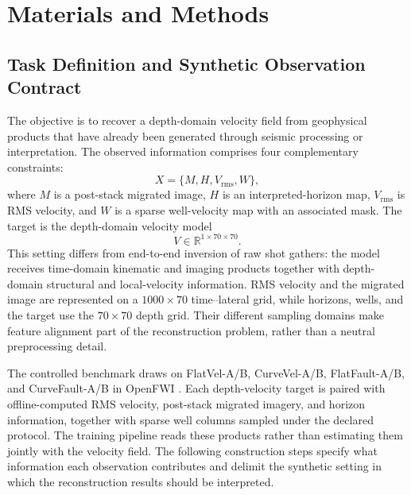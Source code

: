 \section{Materials and Methods}

\subsection{Task Definition and Synthetic Observation Contract}

The objective is to recover a depth-domain velocity field from geophysical products that have already been generated through seismic processing or interpretation. The observed information comprises four complementary constraints:
\[
X=\{M,H,V_{\mathrm{rms}},W\},
\]
where $M$ is a post-stack migrated image, $H$ is an interpreted-horizon map, $V_{\mathrm{rms}}$ is RMS velocity, and $W$ is a sparse well-velocity map with an associated mask. The target is the depth-domain velocity model
\[
V\in\mathbb{R}^{1\times70\times70}.
\]
This setting differs from end-to-end inversion of raw shot gathers: the model receives time-domain kinematic and imaging products together with depth-domain structural and local-velocity information. RMS velocity and the migrated image are represented on a $1000\times70$ time--lateral grid, while horizons, wells, and the target use the $70\times70$ depth grid. Their different sampling domains make feature alignment part of the reconstruction problem, rather than a neutral preprocessing detail.



The controlled benchmark draws on FlatVel-A/B, CurveVel-A/B, FlatFault-A/B, and CurveFault-A/B in OpenFWI \citep{deng2022openfwi}. Each depth-velocity target is paired with offline-computed RMS velocity, post-stack migrated imagery, and horizon information, together with sparse well columns sampled under the declared protocol. The training pipeline reads these products rather than estimating them jointly with the velocity field. The following construction steps specify what information each observation contributes and delimit the synthetic setting in which the reconstruction results should be interpreted.

